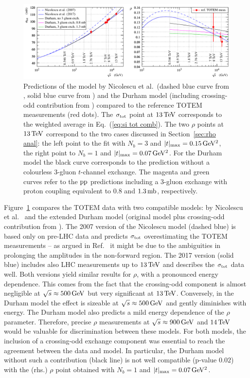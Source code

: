 \begin{figure}
\begin{center}
\includegraphics{fig/matching_models_si_tot_rho.pdf}
\caption{%
Predictions of the model by Nicolescu et al.~(dashed blue curve from \cite{nicolescu-2007}, solid blue curve from \cite{nicolescu-2017}) and the Durham model \cite{durham-2018} (including crossing-odd contribution from \cite{levin-1990}) compared to the reference TOTEM measurements (red dots). The $\sigma_{\rm tot}$ point at $13\,{\rm TeV}$ corresponds to the weighted average in Eq.~(\ref{eq:si tot comb}). The two $\rho$ points at $13\,{\rm TeV}$ correspond to the two cases discussed in Section~\ref{sec:rho anal}: the left point to the fit with $N_b=3$ and $|t|_{\rm max} = 0.15\,{\rm GeV^2}$, the right point to $N_b=1$ and $|t|_{\rm max} = 0.07\,{\rm GeV^2}$. For the Durham model the black curve corresponds to the prediction without a colourless 3-gluon $t$-channel exchange. The magenta and green curves refer to the $\rm pp$ predictions including a 3-gluon exchange with proton coupling equivalent to $0.8$ and $1.3\,{\rm mb}$, respectively.
}
\label{fig:match models}
\end{center}
\end{figure}

Figure~\ref{fig:match models} compares the TOTEM data with two compatible models: by Nicolescu et al.~\cite{nicolescu-2017} and the extended Durham model \cite{durham-2018} (original model \cite{durham-2014} plus crossing-odd contribution from \cite{levin-1990}). The 2007 version of the Nicolescu model (dashed blue) is based only on pre-LHC data and predicts $\sigma_{\rm tot}$ overestimating the TOTEM measurements -- as argued in Ref.~\cite{nicolescu-2017} it might be due to the ambiguities in prolonging the amplitudes in the non-forward region. The 2017 version (solid blue) includes also LHC measurements up to $13\,{\rm TeV}$ and describes the $\sigma_{\rm tot}$ data well. Both versions yield similar results for $\rho$, with a pronounced energy dependence. This comes from the fact that the crossing-odd component is almost negligible at $\sqrt s \approx 500\,{\rm GeV}$ but very significant at $13\,{\rm TeV}$. Conversely, in the Durham model the effect is sizeable at $\sqrt s \approx 500\,{\rm GeV}$ and gently diminishes with energy. The Durham model also predicts a mild energy dependence of the $\rho$ parameter. Therefore, precise $\rho$ measurements at $\sqrt s \approx 900\,{\rm GeV}$ and $14\,{\rm TeV}$ would be valuable for discrimination between these models. For both models, the inclusion of a crossing-odd exchange component was essential to reach the agreement between the data and model. In particular, the Durham model without such a contribution (black line) is not well compatible (p-value $0.02$) with the (rhs.) $\rho$ point obtained with $N_b=1$ and $|t|_{\rm max} = 0.07\,{\rm GeV^2}$.
